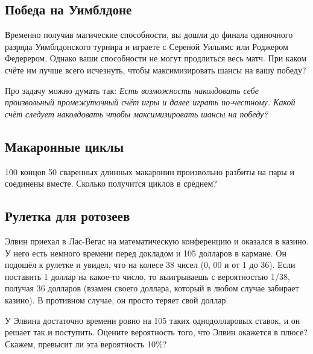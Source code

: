 \subsection*{Победа на Уимблдоне}

Временно получив магические способности, вы дошли до финала одиночного разряда Уимблдонского турнира и играете с Сереной Уильямс или Роджером Федерером.
Однако ваши способности не могут продлиться весь матч.
При каком счёте им лучше всего исчезнуть, чтобы максимизировать шансы на вашу победу?

\begin{addedbytheeditors}
Про задачу можно думать так: 
\textit{Есть возможность наколдовать себе произвольный промежуточный счёт игры и далее играть по-честному.
Какой счёт следует наколдовать чтобы максимизировать шансы на победу?}
\end{addedbytheeditors}



\subsection*{Макаронные циклы}

100 концов 50 сваренных длинных макаронин произвольно разбиты на пары и соединены вместе.
Сколько получится циклов в среднем?

\subsection*{Рулетка для ротозеев}\label{Рулетка для ротозеев}

Элвин приехал в Лас-Вегас на математическую конференцию и оказался в казино.
У него есть немного времени перед докладом и 105 долларов в кармане.
Он подошёл к рулетке и увидел, что на колесе 38 чисел (0, 00 и от 1 до 36).
Если поставить 1 доллар на какое-то число, то выигрываешь с вероятностью 1/38, получая 36 долларов (взамен своего доллара, который в любом случае забирает казино).
В противном случае, он просто теряет свой доллар.

У Элвина достаточно времени ровно на 105 таких однодолларовых ставок, и он решает так и поступить.
Оцените вероятность того, что Элвин окажется в плюсе?
Скажем, превысит ли эта вероятность 10\%?
